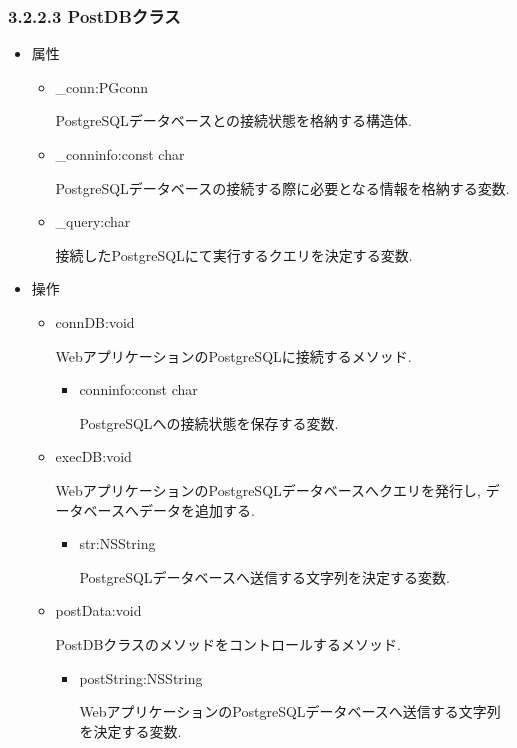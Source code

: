 \subsubsection{3.2.2.3 PostDBクラス}
\begin{itemize}
\item 属性

\begin{itemize}
\item \_conn:PGconn

PostgreSQLデータベースとの接続状態を格納する構造体.

\item \_conninfo:const char

PostgreSQLデータベースの接続する際に必要となる情報を格納する変数.

\item \_query:char

接続したPostgreSQLにて実行するクエリを決定する変数.
\end{itemize}

\item 操作

\begin{itemize}
\item connDB:void

WebアプリケーションのPostgreSQLに接続するメソッド.
\begin{itemize}
\item conninfo:const char

PostgreSQLへの接続状態を保存する変数.
\end{itemize}

\item execDB:void

WebアプリケーションのPostgreSQLデータベースへクエリを発行し, データベースへデータを追加する.
\begin{itemize}
\item str:NSString

PostgreSQLデータベースへ送信する文字列を決定する変数.
\end{itemize}

\item postData:void

PostDBクラスのメソッドをコントロールするメソッド.
\begin{itemize}
\item postString:NSString

WebアプリケーションのPostgreSQLデータベースへ送信する文字列を決定する変数.
\end{itemize}

\end{itemize}

\end{itemize}

